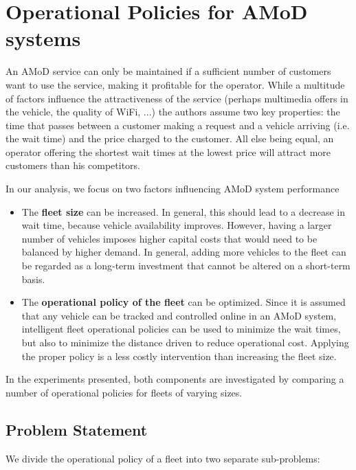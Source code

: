 \section{Operational Policies for AMoD systems}
\label{sec:background}

An AMoD service can only be maintained if a sufficient number of customers want to use the service, making it profitable for the operator. While a multitude of factors influence the attractiveness of the service (perhaps multimedia offers in the vehicle, the quality of WiFi, ...) the authors assume two key properties: the time that passes between a customer making a request and a vehicle arriving (i.e. the wait time) and the price charged to the customer. All else being equal, an operator offering the shortest wait times at the lowest
price will attract more customers than his competitors. 


In our analysis, we focus on two factors influencing AMoD system performance


\begin{itemize}
\item The \textbf{fleet size} can be increased. In general, this should lead to a decrease in wait time, because vehicle availability improves. However, having a larger number of vehicles imposes higher capital costs that would need to be balanced by higher demand. In general, adding more vehicles to the fleet can be regarded as a long-term investment that cannot be altered on a short-term basis.
\item The \textbf{operational policy of the fleet} can be optimized. Since it is assumed that any vehicle can be tracked and controlled online in an AMoD system, intelligent fleet operational policies can be used to minimize the wait times, but also to minimize the distance driven to reduce operational cost. Applying the proper policy is a less costly intervention than increasing the fleet size.
\end{itemize}

In the experiments presented, both components are investigated by comparing a number of operational policies for fleets of varying sizes.


\subsection{Problem Statement}

We divide the operational policy of a fleet into two separate sub-problems:

